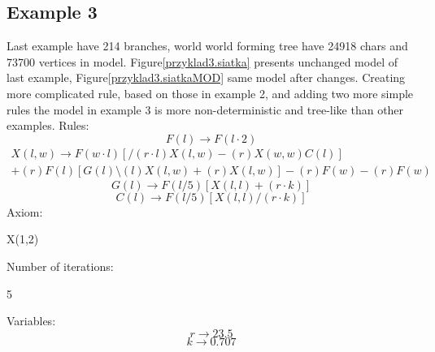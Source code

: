 \documentclass[b5paper,twoside,11pt]{article}
\renewcommand{\figurename}{Figure}
\begin{document}
\subsection*{Example 3}
Last example have 214 branches, world world forming tree have 24918 chars and 73700 vertices in model. 
\figurename \ref{przyklad3.siatka} presents unchanged model of last example, \figurename \ref{przyklad3.siatkaMOD} same model after changes. Creating more complicated rule, based on those in example 2, and adding two more simple rules the model in example 3 is more non-deterministic and tree-like than other examples.
Rules: \newline
\begin{equation*}
F(l)\rightarrow F(l\cdot2) 
\end{equation*}
\begin{multline*}
X(l,w) \rightarrow F(w\cdot l)[/(r\cdot l)X(l,w)-(r)X(w,w)C(l)]\\
+(r)F(l)[G(l)\setminus(l)X(l,w)+(r)X(l,w)]-(r)F(w)-(r)F(w)
\end{multline*}
\begin{equation*}
G(l) \rightarrow F(l/5)[X(l,l)+(r\cdot k)]
\end{equation*}
\begin{equation*}
C(l) \rightarrow F(l/5)[X(l,l)/(r\cdot k)]
\end{equation*}
Axiom:
\begin{center}
X(1,2)
\end{center}
Number of iterations:
\begin{center}
5
\end{center}
Variables:
\begin{equation*}
r\rightarrow 23.5
\end{equation*}
\begin{equation*}
k\rightarrow 0.707
\end{equation*}
\end{document}
